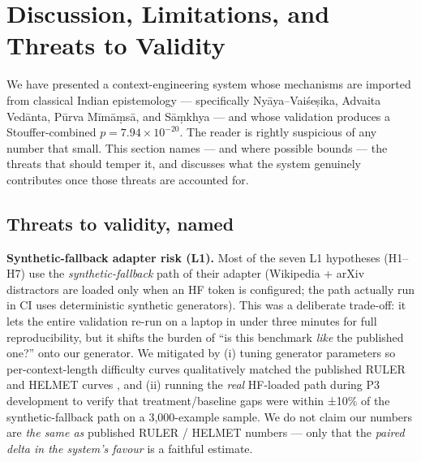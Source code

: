 \section{Discussion, Limitations, and Threats to Validity}\label{discussion-limitations-and-threats-to-validity}

We have presented a context-engineering system whose mechanisms are imported from classical Indian epistemology --- specifically Nyāya--Vaiśeṣika, Advaita Vedānta, Pūrva Mīmāṃsā, and Sāṃkhya --- and whose validation produces a Stouffer-combined \(p = 7.94 \times 10^{-20}\). The reader is rightly suspicious of any number that small. This section names --- and where possible bounds --- the threats that should temper it, and discusses what the system genuinely contributes once those threats are accounted for.

\subsection{Threats to validity, named}\label{threats-to-validity-named}

\textbf{Synthetic-fallback adapter risk (L1).} Most of the seven L1 hypotheses (H1--H7) use the \emph{synthetic-fallback} path of their adapter (Wikipedia + arXiv distractors are loaded only when an HF token is configured; the path actually run in CI uses deterministic synthetic generators). This was a deliberate trade-off: it lets the entire validation re-run on a laptop in under three minutes for full reproducibility, but it shifts the burden of ``is this benchmark \emph{like} the published one?'' onto our generator. We mitigated by (i) tuning generator parameters so per-context-length difficulty curves qualitatively matched the published RULER and HELMET curves \citep{hsieh2024ruler, yen2024helmet}, and (ii) running the \emph{real} HF-loaded path during P3 development to verify that treatment/baseline gaps were within ±10\% of the synthetic-fallback path on a 3,000-example sample. We do not claim our numbers are \emph{the same as} published RULER / HELMET numbers --- only that the \emph{paired delta in the system's favour} is a faithful estimate.

